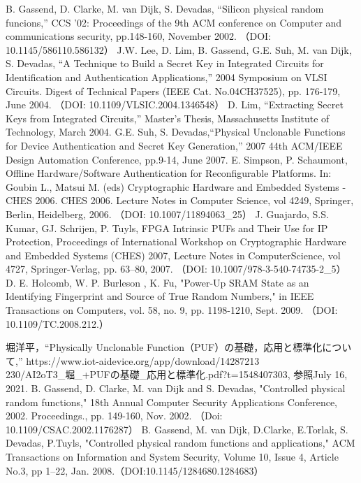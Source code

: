 \documentclass[technicalreport]{ieicej} %
\begin{document}
\begin{thebibliography}{99}
  B. Gassend, D. Clarke, M. van Dijk, S. Devadas, “Silicon physical random funcions,”
  CCS '02: Proceedings of the 9th ACM conference on Computer and communications security,
  pp.148-160, November 2002. （DOI: 10.1145/586110.586132）
  J.W. Lee, D. Lim, B. Gassend, G.E. Suh, M. van Dijk, S. Devadas,
  “A Technique to Build a Secret Key in Integrated Circuits for Identification and Authentication Applications,”
  2004 Symposium on VLSI Circuits. Digest of Technical Papers (IEEE Cat. No.04CH37525),
  pp. 176-179, June 2004. （DOI: 10.1109/VLSIC.2004.1346548）
  D. Lim, “Extracting Secret Keys from Integrated Circuits,” Master's Thesis,
  Massachusetts Institute of Technology, March 2004.
  G.E. Suh, S. Devadas,“Physical Unclonable Functions for Device Authentication and Secret Key Generation,”
  2007 44th ACM/IEEE Design Automation Conference, pp.9-14, June 2007.
  E. Simpson, P. Schaumont, Offline Hardware/Software Authentication for Reconfigurable Platforms.
  In: Goubin L., Matsui M. (eds) Cryptographic Hardware and Embedded Systems - CHES 2006.
  CHES 2006. Lecture Notes in Computer Science, vol 4249, Springer, Berlin, Heidelberg, 2006.
  （DOI: 10.1007/11894063\_25）
  J. Guajardo, S.S. Kumar, GJ. Schrijen, P. Tuyls, FPGA Intrinsic PUFs and Their Use for IP Protection,
  Proceedings of International Workshop on Cryptographic Hardware and Embedded Systems (CHES) 2007,
  Lecture Notes in ComputerScience, vol 4727, Springer-Verlag, pp. 63–80, 2007.
  （DOI: 10.1007/978-3-540-74735-2\_5）
  D. E. Holcomb, W. P. Burleson , K. Fu,
  "Power-Up SRAM State as an Identifying Fingerprint and Source of True Random Numbers,"
  in IEEE Transactions on Computers, vol. 58, no. 9, pp. 1198-1210, Sept. 2009.
  （DOI: 10.1109/TC.2008.212.）

  堀洋平，“Physically Unclonable Function（PUF）の基礎，応用と標準化について,” https://www.iot-aidevice.org/app/download/14287213\\
  230/AI2oT3\_堀\_+PUFの基礎\_応用と標準化.pdf?t=1548407303,
  参照July 16, 2021.
  B. Gassend, D. Clarke, M. van Dijk and S. Devadas, "Controlled physical random functions,"
  18th Annual Computer Security Applications Conference, 2002. Proceedings.,
  pp. 149-160, Nov. 2002. （Doi: 10.1109/CSAC.2002.1176287）
  B. Gassend, M. van Dijk, D.Clarke, E.Torlak, S. Devadas, P.Tuyls,
  "Controlled physical random functions and applications,"
  ACM Transactions on Information and System Security, Volume 10, Issue 4, Article No.3, pp 1–22,
  Jan. 2008.（DOI:10.1145/1284680.1284683）
\end{thebibliography}


\end{document}
